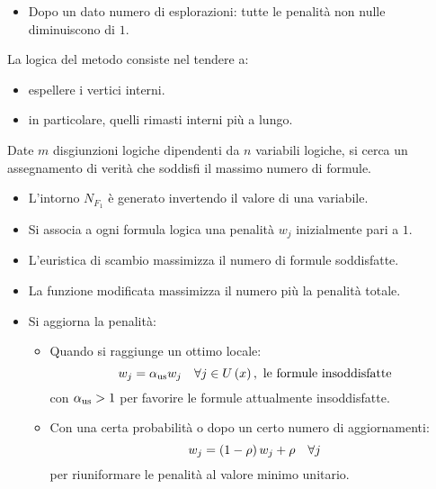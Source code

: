 \documentclass[\main/main.tex]{subfiles}
\begin{document}
\begin{multicols}{2}
\begin{definition}
\begin{itemize}
\begin{itemize}
            \item Dopo un dato numero di esplorazioni: tutte le penalità non nulle diminuiscono di \(1\).
        \end{itemize}
    \end{itemize}
    La logica del metodo consiste nel tendere a:
    \begin{itemize}
        \item espellere i vertici interni.
        \item in particolare, quelli rimasti interni più a lungo.
    \end{itemize}
\end{definition}
\end{multicols}
\clearpage
\begin{multicols}{2}
\begin{definition}
    Date \(m\) disgiunzioni logiche dipendenti da \(n\) variabili logiche, si cerca un assegnamento di verità che soddisfi il massimo numero di formule.
    \begin{itemize}
        \item L'intorno \(N_{F_1}\) è generato invertendo il valore di una variabile.
        \item Si associa a ogni formula logica una penalità \(w_j\) inizialmente pari a \(1\).
        \item L'euristica di scambio massimizza il numero di formule soddisfatte.
        \item La funzione modificata massimizza il numero più la penalità totale.
        \item Si aggiorna la penalità:
        \begin{itemize}
            \item Quando si raggiunge un ottimo locale:
            \[
                w_j = \alpha_{\text{us}}w_j \quad \forall j \in U\left(x\right), \text{ le formule insoddisfatte}
            \]
            con \(\alpha_{\text{us}}>1\) per favorire le formule attualmente insoddisfatte.
            \item Con una certa probabilità o dopo un certo numero di aggiornamenti:
            \[
                w_j = \left(1-\rho\right) w_j + \rho \quad \forall j
            \]
            per riuniformare le penalità al valore minimo unitario.
        \end{itemize}
    \end{itemize}
\end{definition}
\begin{observation}

\end{observation}
\end{multicols}
\end{document}
